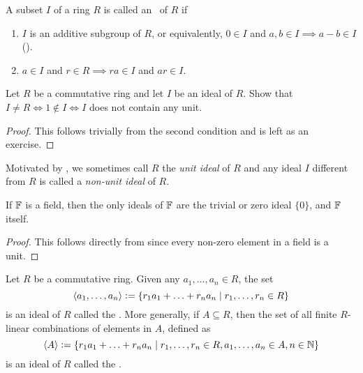 \begin{defn}[Ideal]
    A subset $I$ of a ring $R$ is called an \footnotemark\ of $R$ if 
    \begin{enumerate}
        \item $I$ is an additive subgroup of $R$, or equivalently, $0 \in I$ and $a,b \in I \implies a-b \in I$ (). 
        \item $a \in I$ and $r \in R \implies ra \in I$ and $ar \in I$.
    \end{enumerate}
\end{defn}
\begin{prop} \label{prop:unit-ideal}
    Let $R$ be a commutative ring and let $I$ be an ideal of $R$. Show that $I \neq R \iff 1 \notin I \iff I$ does not contain any unit.
\end{prop}
\begin{proof}
    This follows trivially from the second condition and is left as an exercise.
\end{proof}
Motivated by , we sometimes call $R$ the \emph{unit ideal} of $R$ and any ideal $I$ different from $R$ is called a \emph{non-unit ideal} of $R$.

\begin{cor} \label{cor:ideals-of-a-field}
    If $\mathbb{F}$ is a field, then the only ideals of $\mathbb{F}$ are the trivial or zero ideal $\{0\}$, and $\mathbb{F}$ itself.
\end{cor}
\begin{proof}
    This follows directly from  since every non-zero element in a field is a unit.
\end{proof}

\begin{defn}
    Let $R$ be a commutative ring. Given any $a_1, \ldots, a_n \in R$, the set
    \[
        \langle a_1, \ldots, a_n \rangle \vcentcolon= \left\{ r_1a_1 + \ldots + r_na_n \mid r_1, \ldots, r_n \in R \right\}
    \]
    is an ideal of $R$ called the . More generally, if $A \subseteq R$, then the set of all finite $R$-linear combinations of elements in $A$, defined as
    \[
        \langle A \rangle \vcentcolon= \left\{ r_1a_1 + \ldots + r_na_n \mid r_1, \ldots, r_n \in R, a_1, \ldots, a_n \in A, n \in \mathbb{N} \right\}
    \]
    is an ideal of $R$ called the .\footnotemark
\end{defn}

